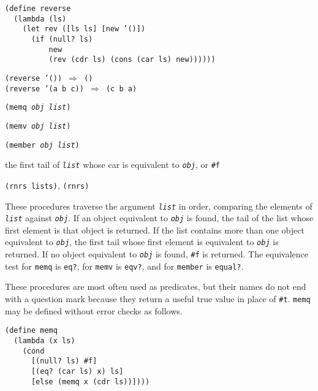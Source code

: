 \begin{alltt}
(define reverse
  (lambda (ls)
    (let rev ([ls ls] [new '()])
      (if (null? ls)
          new
          (rev (cdr ls) (cons (car ls) new))))))

(reverse '()) \(\Rightarrow\) ()
(reverse '(a b c)) \(\Rightarrow\) (c b a)
\end{alltt}

\begin{description}

\label{objects_s51}\item[procedure] \texttt{(memq \textit{obj} \textit{list})}



\item[procedure] \texttt{(memv \textit{obj} \textit{list})}



\item[procedure] \texttt{(member \textit{obj} \textit{list})}



\item[returns] the first tail of \texttt{\textit{list}} whose car is equivalent to \texttt{\textit{obj}}, or \texttt{\#{}f}


\item[libraries] \texttt{(rnrs lists)}, \texttt{(rnrs)}
\end{description}


These procedures traverse the argument \texttt{\textit{list}} in order, comparing the
elements of \texttt{\textit{list}} against \texttt{\textit{obj}}.
If an object equivalent to \texttt{\textit{obj}} is found, the tail of the list whose
first element is that object is returned.
If the list contains more than one object equivalent to \texttt{\textit{obj}}, the first
tail whose first element is equivalent to \texttt{\textit{obj}} is returned.
If no object equivalent to \texttt{\textit{obj}} is found, \texttt{\#{}f} is returned.
The equivalence test for \texttt{memq} is \texttt{eq?}, for \texttt{memv} is \texttt{eqv?},
and for \texttt{member} is \texttt{equal?}.


These procedures are most often used as predicates, but their names do not
end with a question mark because they return a useful true value in place
of \texttt{\#{}t}.
\texttt{memq} may be defined without error checks as follows.


\begin{alltt}
(define memq
  (lambda (x ls)
    (cond
      [(null? ls) \#{}f]
      [(eq? (car ls) x) ls]
      [else (memq x (cdr ls))])))
\end{alltt}

